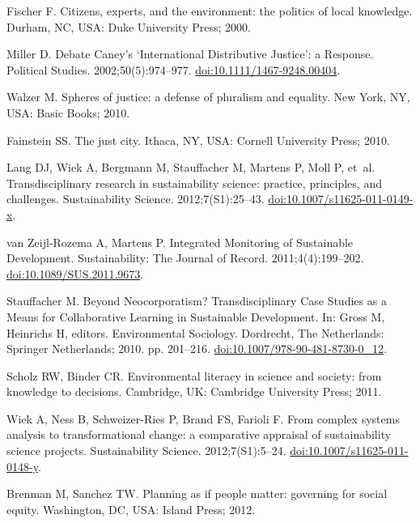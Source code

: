 \documentclass[10pt,a4paper]{article}
\begin{document}
\begin{multicols}{2}
\begin{footnotesize}
\begin{thebibliography}{100}
Fischer F.
\newblock Citizens, experts, and the environment: the politics of local
  knowledge.
\newblock Durham, NC, USA: Duke University Press; 2000.

Miller D.
\newblock Debate {Caney}'s `{International} {Distributive} {Justice}': a
  {Response}.
\newblock Political Studies. 2002;50(5):974--977.
\newblock
  \href{https://doi.org/10.1111/1467-9248.00404}{doi:10.1111/1467-9248.00404}.

Walzer M.
\newblock Spheres of justice: a defense of pluralism and equality.
\newblock New York, NY, USA: Basic Books; 2010.

Fainstein SS.
\newblock The just city.
\newblock Ithaca, NY, USA: Cornell University Press; 2010.

Lang DJ, Wiek A, Bergmann M, Stauffacher M, Martens P, Moll P, et~al.
\newblock Transdisciplinary research in sustainability science: practice,
  principles, and challenges.
\newblock Sustainability Science. 2012;7(S1):25--43.
\newblock
  \href{https://doi.org/10.1007/s11625-011-0149-x}{doi:10.1007/s11625-011-0149-x}.

van Zeijl-Rozema A, Martens P.
\newblock Integrated {Monitoring} of {Sustainable} {Development}.
\newblock Sustainability: The Journal of Record. 2011;4(4):199--202.
\newblock
  \href{https://doi.org/10.1089/SUS.2011.9673}{doi:10.1089/SUS.2011.9673}.

Stauffacher M.
\newblock Beyond {Neocorporatism}? {Transdisciplinary} {Case} {Studies} as a
  {Means} for {Collaborative} {Learning} in {Sustainable} {Development}.
\newblock In: Gross M, Heinrichs H, editors. Environmental {Sociology}.
  Dordrecht, The Netherlands: Springer Netherlands; 2010. pp. 201--216.
\newblock
  \href{https://doi.org/10.1007/978-90-481-8730-0\_12}{doi:10.1007/978-90-481-8730-0\_12}.

Scholz RW, Binder CR.
\newblock Environmental literacy in science and society: from knowledge to
  decisions.
\newblock Cambridge, UK: Cambridge University Press; 2011.

Wiek A, Ness B, Schweizer-Ries P, Brand FS, Farioli F.
\newblock From complex systems analysis to transformational change: a
  comparative appraisal of sustainability science projects.
\newblock Sustainability Science. 2012;7(S1):5--24.
\newblock
  \href{https://doi.org/10.1007/s11625-011-0148-y}{doi:10.1007/s11625-011-0148-y}.

Brenman M, Sanchez TW.
\newblock Planning as if people matter: governing for social equity.
\newblock Washington, DC, USA: Island Press; 2012.


\end{thebibliography}
\end{footnotesize}
\end{multicols}
\end{document}
